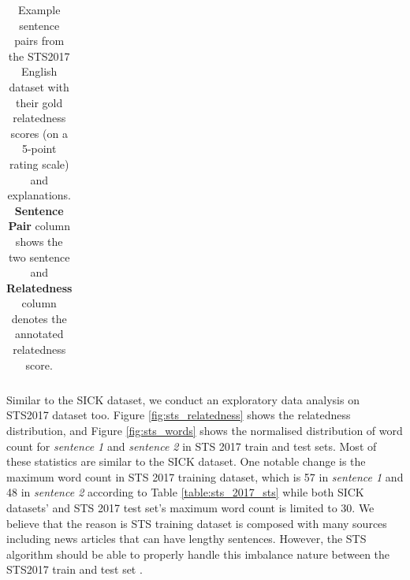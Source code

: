 \begin{enumerate}
\begin{table}[ht!]
\begin{tabular}{l|c}
 	\end{tabular}
 	\caption[Example sentence pairs from the STS2017 English dataset]{Example sentence pairs from the STS2017 English dataset with their gold relatedness scores (on a 5-point rating scale) and explanations. \textbf{Sentence Pair} column shows the two sentence and \textbf{Relatedness} column denotes the annotated relatedness score.}
 	\label{tab:sts2017data}
 \end{table} 

Similar to the SICK dataset, we conduct an exploratory data analysis on STS2017 dataset too. Figure \ref{fig:sts_relatedness} shows the relatedness distribution, and Figure \ref{fig:sts_words} shows the normalised distribution of word count for \emph{sentence 1} and \emph{sentence 2} in STS 2017 train and test sets. Most of these statistics are similar to the SICK dataset. One notable change is the maximum word count in STS 2017 training dataset, which is 57 in \emph{sentence 1} and 48 in \emph{sentence 2} according to Table \ref{table:sts_2017_sts} while both SICK datasets' and STS 2017 test set's maximum word count is limited to 30. We believe that the reason is STS training dataset is composed with many sources including news articles that can have lengthy sentences. However, the STS algorithm should be able to properly handle this imbalance nature between the STS2017 train and test set \autocite{cer-etal-2017-semeval}. 


\end{enumerate}
